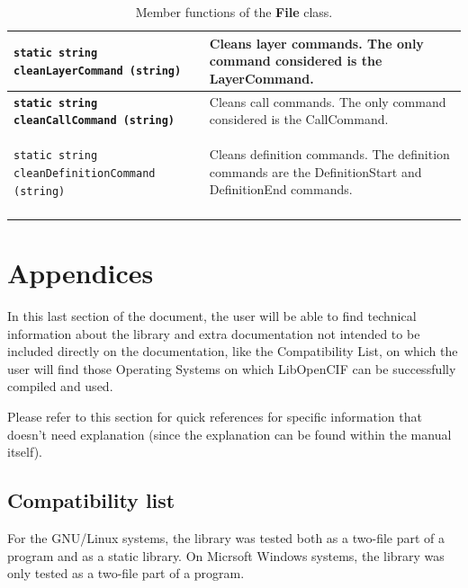\documentclass[11pt,twoside,openany,x11names,svgnames]{memoir}
\newcommand\chapterillustration{}
\begin{document}
{\begin{longtable}{| >{\bfseries}p{9.8cm} | p{5.7cm} |}
	\hline
	
	\texttt{static string cleanLayerCommand (string)} & Cleans layer commands. The only command considered is the LayerCommand. \\
	
	\hline
	
	\texttt{static string cleanCallCommand (string)} & Cleans call commands. The only command considered is the CallCommand. \\
	
	\hline
	
	\texttt{static string cleanDefinitionCommand (string)} & Cleans definition commands. The definition commands are the DefinitionStart and DefinitionEnd commands. \\
			
	\hline
\caption{Member functions of the \textbf{File} class.}
\label{tab:File-MemberFunctions}
\end{longtable}
}

\renewcommand\chapterillustration{images/chapter03-cover}
\chapter{Appendices}\label{Appendices}

In this last section of the document, the user will be able to find technical information about the library and extra documentation not intended to be included directly on the documentation, like the Compatibility List, on which the user will find those Operating Systems on which LibOpenCIF can be successfully compiled and used.

Please refer to this section for quick references for specific information that doesn't need explanation (since the explanation can be found within the manual itself).
\newpage 

\section{Compatibility list}\label{Compatibility-list}

For the GNU/Linux systems, the library was tested both as a two-file part of a program and as a static library. On Micrsoft Windows systems, the library was only tested as a two-file part of a program.
\end{document}
